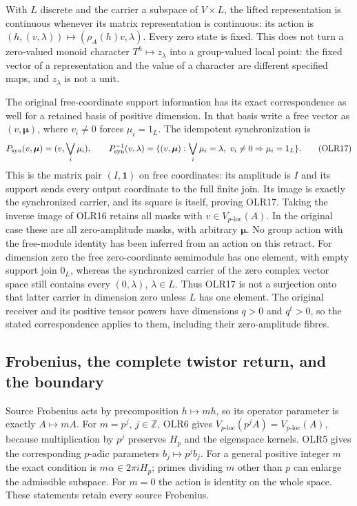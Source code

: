 With $L$ discrete and the carrier a subspace of $V\times L$,
the lifted representation is continuous whenever its matrix
representation is continuous: its action is
$(h,(v,\lambda))\mapsto(\rho_A(h)v,\lambda)$.
Every zero state is fixed. This does not turn a zero-valued monoid
character $T^h\mapsto z_\lambda$ into a group-valued local point:
the fixed vector of a representation and the value of a character
are different specified maps, and $z_\lambda$ is not a unit.

The original free-coordinate support information has its exact
correspondence as well for a retained basis of positive dimension.
In that basis write a free vector as
$(v,\boldsymbol\mu)$, where $v_i\ne0$ forces $\mu_i=1_L$.
The idempotent synchronization is
\[
P_{\rm syn}(v,\boldsymbol\mu)=(v,\bigvee_i\mu_i),\qquad
P_{\rm syn}^{-1}(v,\lambda)
=\{(v,\boldsymbol\mu):\bigvee_i\mu_i=\lambda,
                         \ v_i\ne0\Rightarrow\mu_i=1_L\}.
\tag{OLR17}
\]
This is the matrix pair $(I,\mathbf1)$ on free coordinates:
its amplitude is $I$ and its support sends every output coordinate
to the full finite join. Its image is exactly the synchronized
carrier, and its square is itself, proving OLR17.
Taking the inverse image of OLR16 retains all masks with
$v\in V_{p\text{-loc}}(A)$. In the original case these are all
zero-amplitude masks, with arbitrary $\boldsymbol\mu$.
No group action with the free-module identity has been inferred
from an action on this retract.
For dimension zero the free zero-coordinate semimodule has one
element, with empty support join $0_L$, whereas the synchronized
carrier of the zero complex vector space still contains every
$(0,\lambda)$, $\lambda\in L$. Thus OLR17 is not a surjection
onto that latter carrier in dimension zero unless $L$ has one
element. The original receiver and its positive tensor powers have
dimensions $q>0$ and $q^t>0$, so the stated correspondence applies
to them, including their zero-amplitude fibres.

\subsection{Frobenius, the complete twistor return, and the boundary}

Source Frobenius acts by precomposition $h\mapsto mh$, so its
operator parameter is exactly $A\mapsto mA$.
For $m=p^j$, $j\in\mathbb Z$, OLR6 gives
$V_{p\text{-loc}}(p^jA)=V_{p\text{-loc}}(A)$, because multiplication
by $p^j$ preserves $H_p$ and the eigenspace kernels.
OLR5 gives the corresponding $p$-adic parameters $b_j\mapsto p^j b_j$.
For a general positive integer $m$ the exact condition is
$m\alpha\in2\pi iH_p$; primes dividing $m$ other than $p$ can
enlarge the admissible subspace. For $m=0$ the action is identity
on the whole space. These statements retain every source Frobenius.

